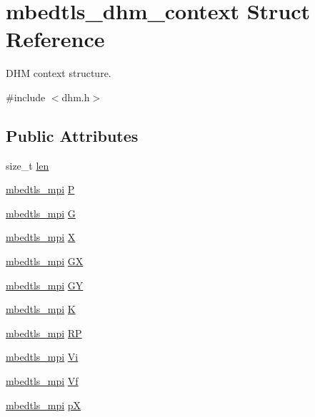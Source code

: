 \hypertarget{structmbedtls__dhm__context}{\section{mbedtls\-\_\-dhm\-\_\-context Struct Reference}
\label{structmbedtls__dhm__context}
}


D\-H\-M context structure.  




{\ttfamily \#include $<$dhm.\-h$>$}

\subsection*{Public Attributes}
\begin{DoxyCompactItemize}
\item 
size\-\_\-t \hyperlink{structmbedtls__dhm__context_aaadf5b8713eeb657004c50742d9e26b1}{len}
\item 
\hyperlink{structmbedtls__mpi}{mbedtls\-\_\-mpi} \hyperlink{structmbedtls__dhm__context_a94404f47038e146712b25d142ea4abd0}{P}
\item 
\hyperlink{structmbedtls__mpi}{mbedtls\-\_\-mpi} \hyperlink{structmbedtls__dhm__context_a4fa0b65bab8ce280ffab2df4285b7ee1}{G}
\item 
\hyperlink{structmbedtls__mpi}{mbedtls\-\_\-mpi} \hyperlink{structmbedtls__dhm__context_a175e534f5a3a4483ebcc4d7ec852d4cd}{X}
\item 
\hyperlink{structmbedtls__mpi}{mbedtls\-\_\-mpi} \hyperlink{structmbedtls__dhm__context_ac33a9d76870e8a807e1d0d9bf77fe85e}{G\-X}
\item 
\hyperlink{structmbedtls__mpi}{mbedtls\-\_\-mpi} \hyperlink{structmbedtls__dhm__context_a834d14fb13ba02b1d604c306d0792bca}{G\-Y}
\item 
\hyperlink{structmbedtls__mpi}{mbedtls\-\_\-mpi} \hyperlink{structmbedtls__dhm__context_a2226d2a7380caf66c6e962e8d5edbb41}{K}
\item 
\hyperlink{structmbedtls__mpi}{mbedtls\-\_\-mpi} \hyperlink{structmbedtls__dhm__context_ae1801da339af972ee271f947b3fe3734}{R\-P}
\item 
\hyperlink{structmbedtls__mpi}{mbedtls\-\_\-mpi} \hyperlink{structmbedtls__dhm__context_a21fea3aadf6f05d8aa42c79e55c5d98c}{Vi}
\item 
\hyperlink{structmbedtls__mpi}{mbedtls\-\_\-mpi} \hyperlink{structmbedtls__dhm__context_a1ebf1105240ca26820edb81f41dd6180}{Vf}
\item 
\hyperlink{structmbedtls__mpi}{mbedtls\-\_\-mpi} \hyperlink{structmbedtls__dhm__context_abd0b3459e4a58e2b29b3bd29f6358319}{p\-X}
\end{DoxyCompactItemize}



